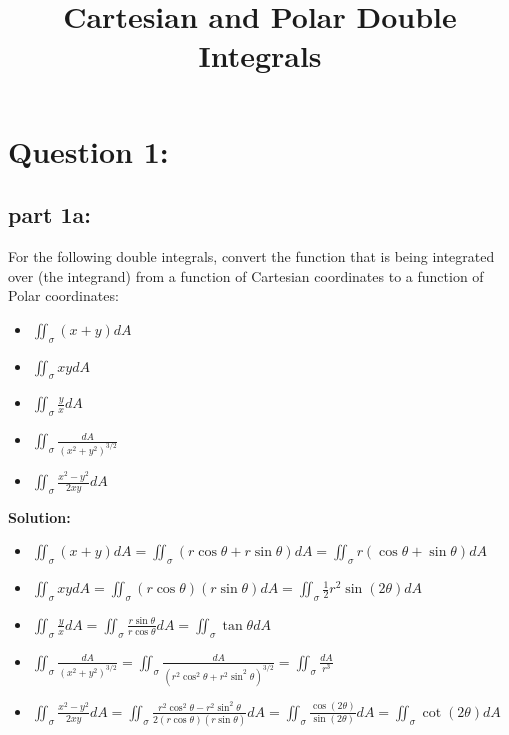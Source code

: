 \documentclass{article}
\title{Cartesian and Polar Double Integrals}
\date{}
\newcommand{\dr}[1]{\textcolor{dark_red}{#1}}
\begin{document}
\maketitle




\section*{Question 1:}

\subsection*{part 1a:}

For the following double integrals, convert the function that is being integrated over (the integrand) from a function of Cartesian coordinates to a function of Polar coordinates:

\begin{itemize}
\item \(\iint_{\sigma} (x + y)dA\)
\item \(\iint_{\sigma} xy dA\)
\item \(\iint_{\sigma} \frac{y}{x}dA\)
\item \(\iint_{\sigma} \frac{dA}{(x^2 + y^2)^{3/2}}\)
\item \(\iint_{\sigma} \frac{x^2 - y^2}{2xy} dA\)
\end{itemize}


\vspace{5mm}
\dr{\textbf{Solution:}}

\dr{
\begin{itemize}
\item \(\iint_{\sigma} (x + y)dA = \iint_{\sigma} (r\cos\theta + r\sin\theta)dA = \iint_{\sigma} r(\cos\theta + \sin\theta)dA\)
\item \(\iint_{\sigma} xy dA = \iint_{\sigma} (r\cos\theta)(r\sin\theta) dA = \iint_{\sigma} \frac{1}{2}r^2\sin(2\theta) dA\)
\item \(\iint_{\sigma} \frac{y}{x}dA = \iint_{\sigma} \frac{r\sin\theta}{r\cos\theta}dA = \iint_{\sigma} \tan\theta dA\)
\item \(\iint_{\sigma} \frac{dA}{(x^2 + y^2)^{3/2}} = \iint_{\sigma} \frac{dA}{(r^2\cos^2\theta + r^2\sin^2\theta)^{3/2}} = \iint_{\sigma} \frac{dA}{r^3}\)
\item \(\iint_{\sigma} \frac{x^2 - y^2}{2xy} dA = \iint_{\sigma} \frac{r^2\cos^2\theta - r^2\sin^2\theta}{2(r\cos\theta)(r\sin\theta)} dA = \iint_{\sigma} \frac{\cos(2\theta)}{\sin(2\theta)} dA = \iint_{\sigma} \cot(2\theta) dA\)
\end{itemize}
}
\end{document}
